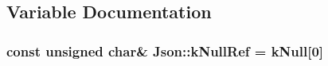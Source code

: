 \subsection{Variable Documentation}
\hypertarget{namespace_json_ab30055b4bbd82aecaca57ccecd63bbe6}{}
\subsubsection[{k\+Null\+Ref}]{\setlength{\rightskip}{0pt plus 5cm}const unsigned char\& Json\+::k\+Null\+Ref = k\+Null\mbox{[}0\mbox{]}}\label{namespace_json_ab30055b4bbd82aecaca57ccecd63bbe6}
